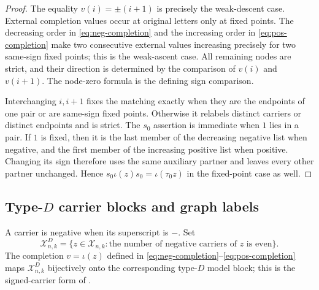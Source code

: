 \documentclass[11pt]{article}
\theoremstyle{definition}
\theoremstyle{remark}
\newcommand{\cX}{\mathcal X}
\begin{document}
\begin{proof}
The equality $v(i)=\pm(i+1)$ is precisely the weak-descent case.  External
completion values occur at original letters only at fixed points.  The
decreasing order in \eqref{eq:neg-completion} and the increasing order in
\eqref{eq:pos-completion} make two consecutive external values increasing
precisely for two same-sign fixed points; this is the weak-ascent case.
All remaining nodes are strict, and their direction is determined by the
comparison of $v(i)$ and $v(i+1)$.  The node-zero formula is the defining
sign comparison.

Interchanging $i,i+1$ fixes the matching exactly when they are the
endpoints of one pair or are same-sign fixed points.  Otherwise it
relabels distinct carriers or distinct endpoints and is strict.  The
$s_0$ assertion is immediate when $1$ lies in a pair.  If $1$ is fixed,
then it is the last member of the decreasing negative list when negative,
and the first member of the increasing positive list when positive.
Changing its sign therefore
uses the same auxiliary partner and leaves every other partner unchanged.
Hence $s_0\iota(z)s_0=\iota(\tau_0z)$ in the fixed-point case as well.
\end{proof}

\subsection{Type-\texorpdfstring{$D$}{D} carrier blocks and graph labels}
\label{subsec:type-D-prelim}

A carrier is negative when its superscript is $-$.  Set
\begin{equation}
 \cX^D_{n,k}=\{z\in\cX_{n,k}:
       \text{the number of negative carriers of $z$ is even}\}.
 \label{eq:type-D-carriers}
\end{equation}
The completion $v=\iota(z)$ defined in
\eqref{eq:neg-completion}--\eqref{eq:pos-completion} maps
$\cX^D_{n,k}$ bijectively onto the corresponding type-$D$ model block;
this is the signed-carrier form of \cite[(2.3)]{MZGelfand}.
\end{document}
